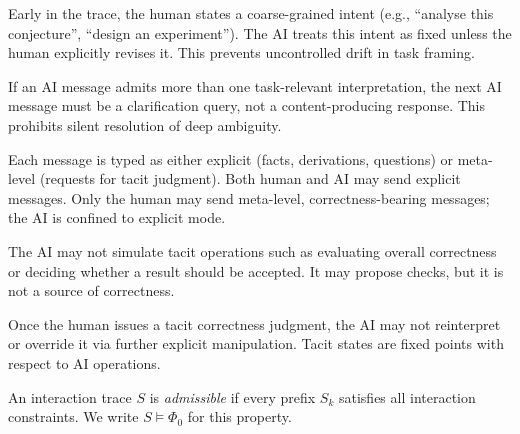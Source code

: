 \begin{description}[leftmargin=2em]
  \item[Intent locking.] Early in the trace, the human states a coarse-grained intent (e.g., ``analyse this conjecture'', ``design an experiment''). The AI treats this intent as fixed unless the human explicitly revises it. This prevents uncontrolled drift in task framing.

  \item[Ambiguity resolution.] If an AI message admits more than one task-relevant interpretation, the next AI message must be a clarification query, not a content-producing response. This prohibits silent resolution of deep ambiguity.

  \item[Mode discipline.] Each message is typed as either explicit (facts, derivations, questions) or meta-level (requests for tacit judgment). Both human and AI may send explicit messages. Only the human may send meta-level, correctness-bearing messages; the AI is confined to explicit mode.

  \item[No tacit emulation.] The AI may not simulate tacit operations such as evaluating overall correctness or deciding whether a result should be accepted. It may propose checks, but it is not a source of correctness.

  \item[Correctness stability.] Once the human issues a tacit correctness judgment, the AI may not reinterpret or override it via further explicit manipulation. Tacit states are fixed points with respect to AI operations.
\end{description}

\begin{definition}
An interaction trace \(S\) is \emph{admissible} if every prefix \(S_k\) satisfies all interaction constraints. We write \(S \vDash \Phi_0\) for this property.
\end{definition}

